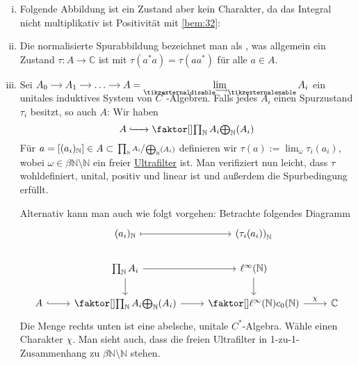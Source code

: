 \begin{beispiel}[{name=[{Zustände,Spurzustände}]}]
	\leavevmode
	\begin{enumerate}[(i)]
		\item Folgende Abbildung ist ein Zustand aber kein Charakter, da das Integral nicht multiplikativ ist Positivität mit \autoref{bem:32}:
		\item Die normalisierte Spurabbildung
		bezeichnet man als , was allgemein ein Zustand $\tau \colon A \to \mathbb{C}$ ist mit $\tau(a^*a)=\tau(aa^*)$ für alle $a \in A$.
		\item Sei 
		$\begin{tikzcd}[cramped,sep=small]
			A_0 \rar & A_1 \rar & \ldots \rar & A =\Dlim\, A_i
		\end{tikzcd}$
		ein unitales induktives System von $C^*$-Algebren.
		Falls jedes $A_i$ einen Spurzustand $\tau_i$ besitzt, so auch $A$: Wir haben
		\[
			A \xhookrightarrow{\minwidthbox{}{1.4em}} \Faktor{\prod_\mathbb{N} A_i}{\bigoplus_\mathbb{N}(A_i)}
		\]
		Für $a=\benbrace*{(a_i)_\mathbb{N}}\in A \subset \sfrac{\prod_\mathbb{N} A_i}{\bigoplus_\mathbb{N}(A_i)}$ definieren wir $\tau(a) := \lim_\omega \tau_i(a_i)$, wobei $\omega \in \beta \mathbb{N} \setminus \mathbb{N}$ ein freier \href{https://de.wikipedia.org/wiki/Ultrafilter}{Ultrafilter} ist.
		Man verifiziert nun leicht, dass $\tau$ wohldefiniert, unital, positiv und linear ist und außerdem die Spurbedingung erfüllt.  
		
		Alternativ kann man auch wie folgt vorgehen: Betrachte folgendes Diagramm
		\[
			\begin{tikzcd}
				& (a_i)_\mathbb{N} \rar[mapsto] & \enbrace*{\tau_i(a_i)}_\mathbb{N} \\
				&\prod_\mathbb{N} A_i \rar \dar & \ell^\infty(\mathbb{N}) \dar \\
				A \rar[hook] &\Faktor{\prod_\mathbb{N} A_i}{\bigoplus_\mathbb{N}(A_i)} \rar & \Faktor{\ell^\infty(\mathbb{N})}{c_0(\mathbb{N})} \rar["\chi"] & \mathbb{C}
			\end{tikzcd}
		\]
		Die Menge rechts unten ist eine abelsche, unitale $C^*$-Algebra. Wähle einen Charakter $\chi$. Man sieht auch, dass die freien Ultrafilter in 1-zu-1-Zusammenhang zu $\beta \mathbb{N} \setminus \mathbb{N}$ stehen.
	\end{enumerate}
\end{beispiel}

